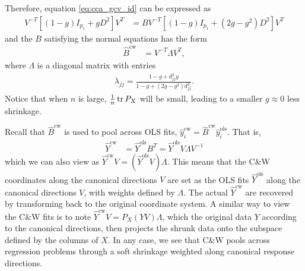\documentclass{article}
\begin{document}
Therefore, equation \ref{eq:cca_gcv_id} can be expressed as
\begin{align*}
  V^{-T}\left[\left(1 - g\right)I_{p_{1}} + gD^{2}\right]V^{T} &=
  BV^{-T}\left[\left(1 - g\right)I_{p_{1}} + \left(2g -
      g^2\right)D^{2}\right]V^{T}
\end{align*}
and the $B$ satisfying the normal equations has the form
\begin{align*}
\hat{B}^{\text{cw}} &= V^{-T}\Lambda V^{T},
\end{align*}
where $\Lambda$ is a diagonal matrix with entries
\begin{align*}
\lambda_{jj} = \frac{1 - g + d_{jj}^{2}g}{1 - g + \left(2g -
    g^{2}\right)d_{jj}^{2}}.
\end{align*}
Notice that when $n$ is large, $\frac{1}{n}\mathop\mathrm{tr} P_{X}$ will be small, leading to
a smaller $g \approx 0$ less shrinkage.

Recall that $\hat{B}^{\text{cw}}$ is used to pool across OLS fits,
$\hat{y}_{i}^{\text{cw}} = \hat{B}^{\text{cw}}\hat{y}_{i}^{\text{ols}}$. That
is,
\begin{align*}
\hat{Y}^{\text{cw}} &= \hat{Y}^{\text{ols}}B^{T} =
\hat{Y}^{\text{ols}}V\Lambda V^{-1}
\end{align*}
which we can also view as $\hat{Y}^{\text{cw}}V =
\left(\hat{Y}^{\text{ols}}V\right)\Lambda$. This means that the C\&W coordinates
along the canonical directions $V$ are set as the OLS fits
$\hat{Y}^{\text{ols}}$ along the canonical directions $V$, with weights defined
by $\Lambda$. The actual $\hat{Y}^{\text{cw}}$ are recovered by transforming
back to the original coordinate system. A similar way to view the C\&W fits is
to note $\hat{Y}^{\text{cw}}V = P_{X}\left(YV\right)\Lambda$, which the original
data $Y$ according to the canonical directions, then projects the shrunk data
onto the subspace defined by the columns of $X$. In any case, we see that C\&W
pools across regression problems through a soft shrinkage weighted along
canonical response directions.
\end{document}
